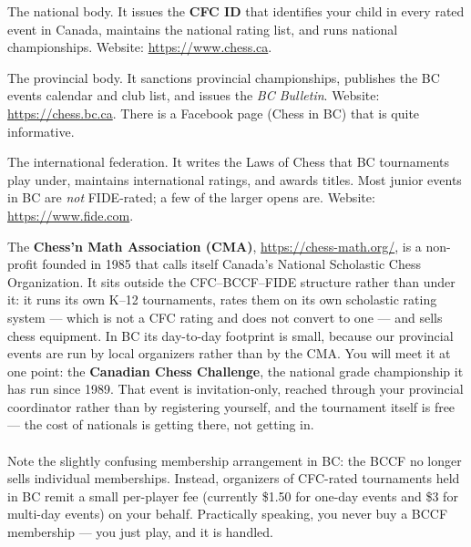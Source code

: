 \documentclass[10pt,letterpaper]{article}
\newcommand{\term}[1]{\textbf{#1}}
\begin{document}
\begin{description}[leftmargin=0pt,style=nextline,itemsep=6pt]
  \item[Chess Federation of Canada (CFC)] The national body. It issues the
        \term{CFC ID} that identifies your child in every rated event in
        Canada, maintains the national rating list, and runs national
        championships. Website: \url{https://www.chess.ca}. 
  \item[British Columbia Chess Federation (BCCF)] The provincial body. It
        sanctions provincial championships, publishes the BC events calendar
        and club list, and issues the \emph{BC Bulletin}. Website:
        \url{https://chess.bc.ca}. There is a Facebook page (Chess in BC) that is quite informative.
  \item[FIDE] The international federation. It writes the Laws of Chess that
        BC tournaments play under, maintains international ratings, and awards
        titles. Most junior events in BC are \emph{not} FIDE-rated; a few of
        the larger opens are. Website: \url{https://www.fide.com}.


\item[And a fourth body] 
The \term{Chess'n Math Association (CMA)}, \url{https://chess-math.org/}, is a non-profit founded in 1985 that
calls itself Canada's National Scholastic Chess Organization. It sits outside
the CFC--BCCF--FIDE structure rather than under it: it runs its own K--12
tournaments, rates them on its own scholastic rating system --- which is not a
CFC rating and does not convert to one --- and sells chess equipment. In BC its
day-to-day footprint is small, because our provincial events are run by local
organizers rather than by the CMA. You will meet it at one point: the
\term{Canadian Chess Challenge}, the national grade championship it has run
since 1989. That event is invitation-only, reached through your provincial
coordinator rather than by registering yourself, and the tournament itself is
free --- the cost of nationals is getting there, not getting in.

\end{description}


\paragraph{} Note the slightly confusing membership arrangement in BC: the BCCF no longer
sells individual memberships. Instead, organizers of CFC-rated tournaments held
in BC remit a small per-player fee (currently \$1.50 for one-day events and \$3
for multi-day events) on your behalf. Practically speaking, you never buy a
BCCF membership --- you just play, and it is handled.
\end{document}

